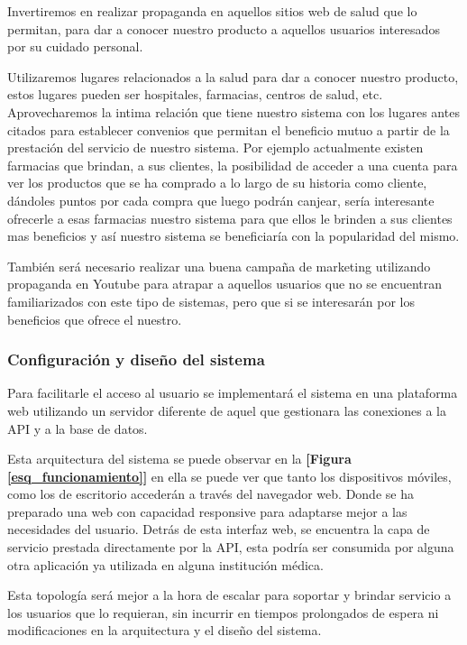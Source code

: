 Invertiremos en realizar propaganda en aquellos sitios web de salud que lo permitan, para dar a conocer nuestro producto a aquellos usuarios interesados por su cuidado personal.

Utilizaremos lugares relacionados a la salud para dar a conocer nuestro producto, estos lugares pueden ser hospitales, farmacias, centros de salud, etc. Aprovecharemos la intima relación que tiene nuestro sistema con los lugares antes citados para establecer  convenios que permitan el beneficio mutuo  a partir de la prestación del servicio de nuestro sistema. 
Por ejemplo actualmente existen farmacias que brindan, a sus clientes, la posibilidad  de acceder a una cuenta para ver  los productos que se ha comprado a lo largo de su historia como cliente, dándoles puntos por cada compra que luego podrán canjear, sería interesante ofrecerle a esas farmacias nuestro sistema para que ellos le brinden a sus clientes mas beneficios y así nuestro sistema se beneficiaría con la popularidad del mismo.

También será necesario realizar una buena campaña de marketing utilizando propaganda en Youtube para atrapar a aquellos usuarios que no se encuentran familiarizados con este tipo de sistemas, pero que si se interesarán por los beneficios que ofrece el nuestro.

\subsubsection{Configuración y diseño del sistema}
Para facilitarle el acceso al usuario se implementará el sistema en una plataforma web utilizando un servidor diferente de aquel que gestionara las conexiones a la  API y a la base de datos.

Esta arquitectura del sistema se puede observar en la \textbf{[Figura \ref{esq_funcionamiento}]} en ella se puede ver que tanto los dispositivos móviles, como los de escritorio accederán a través del navegador web. Donde se ha preparado una web con capacidad responsive para adaptarse mejor a las necesidades del usuario. Detrás de esta interfaz web, se encuentra la capa de servicio prestada directamente por la API, esta podría ser consumida por alguna otra aplicación ya utilizada en alguna institución médica.

Esta topología será mejor a la hora de escalar para soportar y brindar servicio a los usuarios que lo requieran, sin incurrir en tiempos prolongados de espera ni modificaciones en la arquitectura y el diseño del sistema.


